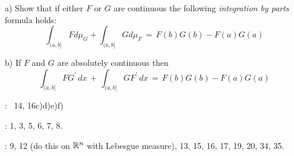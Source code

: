 a)  Show that if either $F$ or $G$ are continuous the following {\it integration by parts} formula holds:
$$ \int_{(a, b]} F d\mu_G + \int_{(a, b]} G d\mu_F \, =\, F(b)G(b) - F(a)G(a) $$

\smallskip
b)  If  $F$ and $G$ are absolutely continuous then 
$$ \int_{(a, b]} F G^{\prime} \, dx \,+\,  \int_{(a, b]} G F^{\prime} \, dx \, =\, F(b)G(b) - F(a)G(a) $$

\bigskip

:  \, 14, 16c)d)e)f) 
 
 \bigskip
 
 \bigskip
 
 \endhead
\medskip

:  1, 3, 5, 6, 7, 8.


\endhead
\medskip

: 9,  12 (do this on $\Bbb R^n$ with Lebesgue measure), 13, 15, 16, 17, 19, 20, 34, 35.



 
 \enddocument



                                               













